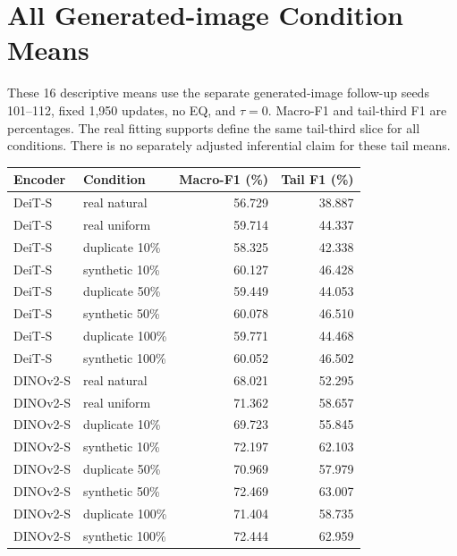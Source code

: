\documentclass[conference]{IEEEtran}
\begin{document}
\section{All Generated-image Condition Means}
\label{app:generatedmeans}
These 16 descriptive means use the separate generated-image follow-up seeds 101--112, fixed 1,950 updates, no EQ, and $\tau=0$. Macro-F1 and tail-third F1 are percentages. The real fitting supports define the same tail-third slice for all conditions. There is no separately adjusted inferential claim for these tail means.
\begin{center}\footnotesize\begin{tabular}{llrr}
\toprule
Encoder & Condition & Macro-F1 (\%) & Tail F1 (\%) \\
\midrule
DeiT-S & real natural & 56.729 & 38.887 \\
DeiT-S & real uniform & 59.714 & 44.337 \\
DeiT-S & duplicate 10\% & 58.325 & 42.338 \\
DeiT-S & synthetic 10\% & 60.127 & 46.428 \\
DeiT-S & duplicate 50\% & 59.449 & 44.053 \\
DeiT-S & synthetic 50\% & 60.078 & 46.510 \\
DeiT-S & duplicate 100\% & 59.771 & 44.468 \\
DeiT-S & synthetic 100\% & 60.052 & 46.502 \\
DINOv2-S & real natural & 68.021 & 52.295 \\
DINOv2-S & real uniform & 71.362 & 58.657 \\
DINOv2-S & duplicate 10\% & 69.723 & 55.845 \\
DINOv2-S & synthetic 10\% & 72.197 & 62.103 \\
DINOv2-S & duplicate 50\% & 70.969 & 57.979 \\
DINOv2-S & synthetic 50\% & 72.469 & 63.007 \\
DINOv2-S & duplicate 100\% & 71.404 & 58.735 \\
DINOv2-S & synthetic 100\% & 72.444 & 62.959 \\
\bottomrule\end{tabular}\end{center}
\end{document}

